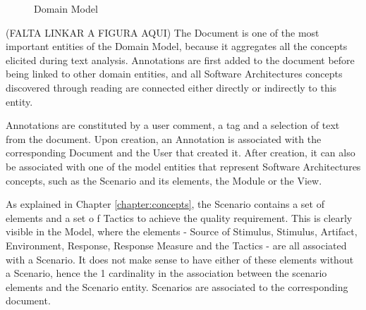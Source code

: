 \begin{figure}
\caption{Domain Model}
\label{figure:domainModel}
\end{figure}
(FALTA LINKAR A FIGURA AQUI)
The Document is one of the most important entities of the Domain Model, because it aggregates all the concepts elicited during text analysis. Annotations are first added to the document before being linked to other domain entities, and all Software Architectures concepts discovered through reading are connected either directly or indirectly to this entity.

Annotations are constituted by a user comment, a tag and a selection of text from the document. Upon creation, an Annotation is associated with the corresponding Document and the User that created it. After creation, it can also be associated with one of the model entities that represent Software Architectures concepts, such as the Scenario and its elements, the Module or the View. 

As explained in Chapter \ref{chapter:concepts}, the Scenario contains a set of elements and a set o	f Tactics to achieve the quality requirement. This is clearly visible in the Model, where the elements - Source of Stimulus, Stimulus, Artifact, Environment, Response, Response Measure and the Tactics - are all associated with a Scenario. It does not make sense to have either of these elements without a Scenario, hence the 1 cardinality in the association between the scenario elements and the Scenario entity. Scenarios are associated to the corresponding document.

